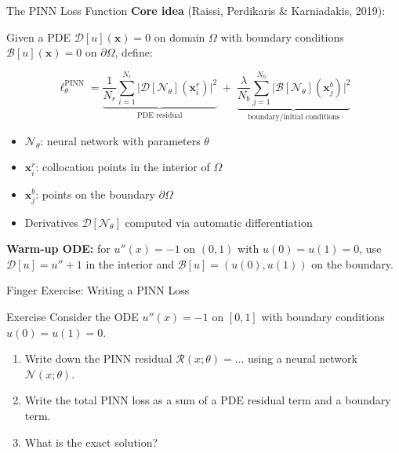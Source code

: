 \documentclass[aspectratio=169,11pt]{beamer}
\newcommand{\emphc}[1]{\textcolor{harvardcrimson}{#1}}
\newcommand{\x}{\bm{x}}
\begin{document}
\begin{frame}{The PINN Loss Function}
\textbf{Core idea} (Raissi, Perdikaris \& Karniadakis, 2019):

\vspace{0.15em}
Given a PDE $\mathcal{D}[u](\x) = 0$ on domain $\Omega$ with boundary conditions
$\mathcal{B}[u](\x) = 0$ on $\partial\Omega$, define:

\vspace{0.1em}
\[
\boxed{
\ell_\theta^{\mathrm{PINN}} =
\underbrace{\frac{1}{N_r}\sum_{i=1}^{N_r}
\bigl|\mathcal{D}[\mathcal{N}_\theta](\x_i^r)\bigr|^2}_{\text{PDE residual}}
\;+\;
\underbrace{\frac{\lambda}{N_b}\sum_{j=1}^{N_b}
\bigl|\mathcal{B}[\mathcal{N}_\theta](\x_j^b)\bigr|^2}_{\text{boundary/initial conditions}}
}
\]

\vspace{0.05em}
\begin{itemize}
    \item $\mathcal{N}_\theta$: neural network with parameters $\theta$
    \item $\x_i^r$: \emphc{collocation points} in the interior of $\Omega$
    \item $\x_j^b$: points on the boundary $\partial\Omega$
    \item Derivatives $\mathcal{D}[\mathcal{N}_\theta]$ computed via \emphc{automatic differentiation}
\end{itemize}
{\scriptsize \textbf{Warm-up ODE:} for $u''(x)=-1$ on $(0,1)$ with $u(0)=u(1)=0$, use $\mathcal{D}[u]=u''+1$ in the interior and $\mathcal{B}[u]=(u(0),u(1))$ on the boundary.}
\end{frame}

\begin{frame}{\exercisepause{} Finger Exercise: Writing a PINN Loss}
\begin{exampleblock}{Exercise}
Consider the ODE $u''(x) = -1$ on $[0,1]$ with boundary conditions $u(0) = u(1) = 0$.
\begin{enumerate}
    \item Write down the PINN residual $\mathcal{R}(x; \theta) = \ldots$ using a neural network $\mathcal{N}(x; \theta)$.
    \item Write the total PINN loss as a sum of a PDE residual term and a boundary term.
    \item What is the exact solution?
\end{enumerate}
\end{exampleblock}
\end{frame}
\end{document}
